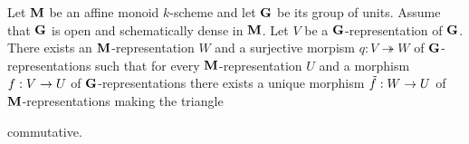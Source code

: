 \begin{theorem}
Let $\mathbf{M}$ be an affine monoid $k$-scheme and let $\mathbf{G}$ be its group of units. Assume that $\mathbf{G}$ is open and schematically dense in $\mathbf{M}$. Let $V$ be a $\mathbf{G}$-representation of $\mathbf{G}$. There exists an $\mathbf{M}$-representation $W$ and a surjective morpism $q:V\twoheadrightarrow W$ of $\mathbf{G}$-representations such that for every $\mathbf{M}$-representation $U$ and a morphism $f:V\rightarrow U$ of $\mathbf{G}$-representations there exists a unique morphism $\tilde{f}:W\rightarrow U$ of $\mathbf{M}$-representations making the triangle
\begin{center}
\end{center}
commutative.
\end{theorem}
